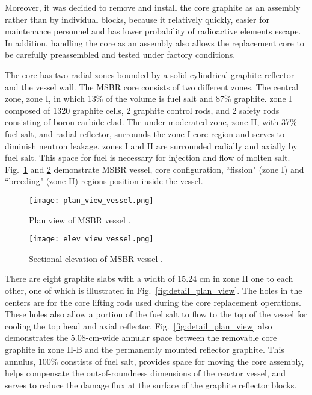 Moreover, it was decided to remove and install the core graphite as an assembly rather than by individual blocks, because it relatively quickly, easier for maintenance personnel and has lower probability of radioactive elements escape. In addition, handling the core as an assembly also allows the replacement core to be carefully preassembled and tested under factory conditions.

The core has two radial zones bounded by a solid cylindrical graphite reflector 
and the vessel wall. The \gls{MSBR} core consists of two different zones. The central zone, zone I, in which 13\% of the volume is fuel salt and 87\% graphite. 
zone I composed of 1320 graphite cells, 2 graphite control rods, and 
2 safety rods consisting of boron carbide clad. The under-moderated zone, zone 
II, with 37\% fuel salt, and radial reflector, surrounds the zone I core region 
and serves to diminish neutron leakage. zones I and II are surrounded radially and axially by fuel salt. This space for fuel is necessary for injection and flow of molten salt. Fig.~\ref{fig:ref_plan_msbr} and \ref{fig:ref_sect_msbr} demonstrate \gls{MSBR} vessel, core configuration, ``fission" (zone I) and ``breeding" (zone II) regions position inside the vessel.

\begin{figure}[hbp!] %
  \centering
  \vspace{-0.3em}
  \texttt{[image: plan\_view\_vessel.png]}
  \caption{Plan view of \gls{MSBR} vessel \cite{robertson_conceptual_1971}.}
  \vspace{-0.6em}
  \label{fig:ref_plan_msbr}
\end{figure}
\FloatBarrier

\begin{figure}[hbp!] %
  \centering
  \vspace{-0.3em}
  \texttt{[image: elev\_view\_vessel.png]}
  \caption{Sectional elevation of \gls{MSBR} vessel \cite{robertson_conceptual_1971}.}
  \vspace{-0.6em}
  \label{fig:ref_sect_msbr}
\end{figure}
\FloatBarrier

There are eight graphite slabs with a width of 15.24 cm in zone II one to each other, one of which is illustrated in Fig.~\ref{fig:detail_plan_view}. The holes in the centers are for the core lifting rods used during the core replacement operations. These holes also allow a portion of the fuel salt to flow to the top of the vessel for cooling the top head and axial reflector. Fig.~\ref{fig:detail_plan_view} also demonstrates the 5.08-cm-wide annular space between the removable core graphite in zone II-B and the permanently mounted reflector graphite. This annulus, 100\% constists of fuel salt, provides space for moving the core assembly, helps compensate the out-of-roundness dimensions of the reactor vessel, and serves to reduce the damage flux at the surface of the graphite reflector blocks.

